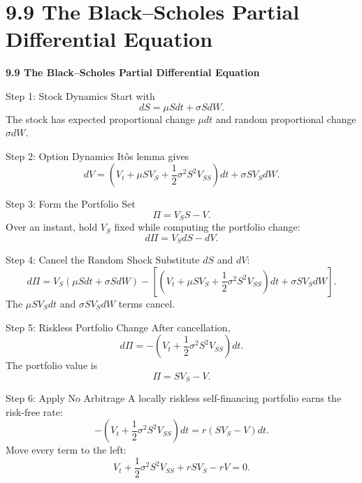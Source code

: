 \documentclass[aspectratio=169]{beamer}
\begin{document}
\section{9.9 The Black--Scholes Partial Differential Equation}
\begin{frame}[plain]
\centering\vfill
{\color{TitleBlue}\Large\bfseries 9.9 The Black--Scholes Partial Differential Equation}\par
\vspace{0.5cm}{\large Complete algebra from the hedge to the PDE}\par
\vfill\end{frame}

\begin{frame}[t]{Step 1: Stock Dynamics}
\justifying
Start with
\[dS=\mu Sdt+\sigma SdW.\]
The stock has expected proportional change $\mu dt$ and random proportional change $\sigma dW$.
\end{frame}

\begin{frame}[t]{Step 2: Option Dynamics}
\justifying
It\^o\textquotesingle s lemma gives
\[dV=\left(V_t+\mu SV_S+\frac12\sigma^2S^2V_{SS}\right)dt+\sigma SV_SdW.\]
\end{frame}

\begin{frame}[t]{Step 3: Form the Portfolio}
\justifying
Set
\[\Pi=V_S S-V.\]
Over an instant, hold $V_S$ fixed while computing the portfolio change:
\[d\Pi=V_SdS-dV.\]
\end{frame}

\begin{frame}[t]{Step 4: Cancel the Random Shock}
\justifying
\small
Substitute $dS$ and $dV$:
\[d\Pi=V_S(\mu Sdt+\sigma SdW)-\left[\left(V_t+\mu SV_S+\frac12\sigma^2S^2V_{SS}\right)dt+\sigma SV_SdW\right].\]
The $\mu SV_Sdt$ and $\sigma SV_SdW$ terms cancel.
\end{frame}

\begin{frame}[t]{Step 5: Riskless Portfolio Change}
\justifying
After cancellation,
\[d\Pi=-\left(V_t+\frac12\sigma^2S^2V_{SS}\right)dt.\]
The portfolio value is
\[\Pi=SV_S-V.\]
\end{frame}

\begin{frame}[t]{Step 6: Apply No Arbitrage}
\justifying
A locally riskless self-financing portfolio earns the risk-free rate:
\[-\left(V_t+\frac12\sigma^2S^2V_{SS}\right)dt=r(SV_S-V)dt.\]
Move every term to the left:
\[\boxed{V_t+\frac12\sigma^2S^2V_{SS}+rSV_S-rV=0}.\]
\end{frame}
\end{document}
